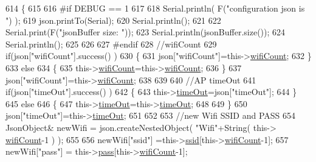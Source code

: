 \begin{DoxyCode}
614         \{
615         
616 \textcolor{preprocessor}{        #if DEBUG == 1 }
617         
618             Serial.println( F(\textcolor{stringliteral}{"configuration json is "}) );
619             json.printTo(Serial);
620             Serial.println();
621 
622             Serial.print(F(\textcolor{stringliteral}{"jsonBuffer size: "}));
623             Serial.println(jsonBuffer.size());
624             Serial.println();
625 
626 
627 \textcolor{preprocessor}{        #endif}
628             \textcolor{comment}{//wifiCount}
629             \textcolor{keywordflow}{if}(json[\textcolor{stringliteral}{"wifiCount"}].success() )
630             \{           
631                 json[\textcolor{stringliteral}{"wifiCount"}]=this->\hyperlink{class_cool_wifi_ab133bd92fcb895b884deecd6678592e4}{wifiCount};
632             \}
633             \textcolor{keywordflow}{else}
634             \{
635                 this->\hyperlink{class_cool_wifi_ab133bd92fcb895b884deecd6678592e4}{wifiCount}=this->\hyperlink{class_cool_wifi_ab133bd92fcb895b884deecd6678592e4}{wifiCount};
636             \}
637             json[\textcolor{stringliteral}{"wifiCount"}]=this->\hyperlink{class_cool_wifi_ab133bd92fcb895b884deecd6678592e4}{wifiCount};
638 
639             
640             \textcolor{comment}{//AP timeOut}
641             \textcolor{keywordflow}{if}(json[\textcolor{stringliteral}{"timeOut"}].success() )
642             \{
643                 this->\hyperlink{class_cool_wifi_a952111605f25156588b5632caaba1c6f}{timeOut}=json[\textcolor{stringliteral}{"timeOut"}];
644             \}
645             \textcolor{keywordflow}{else}
646             \{
647                 this->\hyperlink{class_cool_wifi_a952111605f25156588b5632caaba1c6f}{timeOut}=this->\hyperlink{class_cool_wifi_a952111605f25156588b5632caaba1c6f}{timeOut};
648 
649             \}
650             json[\textcolor{stringliteral}{"timeOut"}]=this->\hyperlink{class_cool_wifi_a952111605f25156588b5632caaba1c6f}{timeOut};
651             
652             
653             \textcolor{comment}{//new Wifi SSID and PASS}
654             JsonObject& newWifi = json.createNestedObject( \textcolor{stringliteral}{"Wifi"}+String( this->
      \hyperlink{class_cool_wifi_ab133bd92fcb895b884deecd6678592e4}{wifiCount}-1 ) );
655             
656             newWifi[\textcolor{stringliteral}{"ssid"}] =this->\hyperlink{class_cool_wifi_a893b21d0fed821438733bba2e73fb4c2}{ssid}[this->\hyperlink{class_cool_wifi_ab133bd92fcb895b884deecd6678592e4}{wifiCount}-1];
657             newWifi[\textcolor{stringliteral}{"pass"}] = this->\hyperlink{class_cool_wifi_a0c3332a149245aaad060b32593a54c9b}{pass}[this->\hyperlink{class_cool_wifi_ab133bd92fcb895b884deecd6678592e4}{wifiCount}-1];

\end{DoxyCode}
